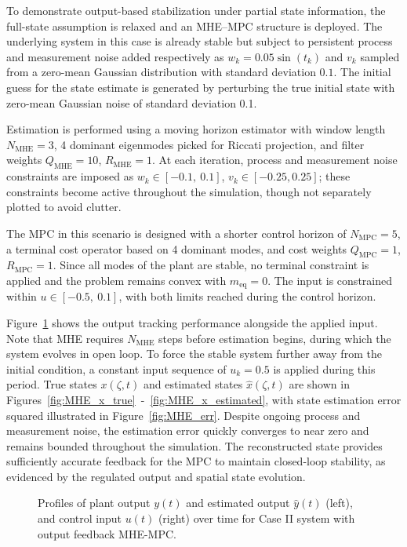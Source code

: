 To demonstrate output-based stabilization under partial state information, the full-state assumption is relaxed and an MHE--MPC structure is deployed. The underlying system in this case is already stable but subject to persistent process and measurement noise added respectively as $w_k = 0.05 \sin(t_k)$ and $v_k$ sampled from a zero-mean Gaussian distribution with standard deviation $0.1$. The initial guess for the state estimate is generated by perturbing the true initial state with zero-mean Gaussian noise of standard deviation 0.1. 

Estimation is performed using a moving horizon estimator with window length $N_{\mathrm{MHE}} = 3$, 4 dominant eigenmodes picked for Riccati projection, and filter weights $Q_{\mathrm{MHE}} = 10$, $R_{\mathrm{MHE}} = 1$. At each iteration, process and measurement noise constraints are imposed as $w_k \in [-0.1,\ 0.1]$, $v_k \in [-0.25, 0.25]$; these constraints become active throughout the simulation, though not separately plotted to avoid clutter.

The MPC in this scenario is designed with a shorter control horizon of $N_{\mathrm{MPC}} = 5$, a terminal cost operator based on 4 dominant modes, and cost weights $Q_{\mathrm{MPC}} = 1$, $R_{\mathrm{MPC}} = 1$. Since all modes of the plant are stable, no terminal constraint is applied and the problem remains convex with $m_{\mathrm{eq}} = 0$. The input is constrained within $u \in [-0.5,\ 0.1]$, with both limits reached during the control horizon.

Figure~\ref{fig:input_output_MHE} shows the output tracking performance alongside the applied input. Note that MHE requires $N_{\mathrm{MHE}}$ steps before estimation begins, during which the system evolves in open loop. To force the stable system further away from the initial condition, a constant input sequence of $u_k = 0.5$ is applied during this period. True states $x(\zeta,t)$ and estimated states $\hat{x}(\zeta,t)$ are shown in Figures~\ref{fig:MHE_x_true}~-~\ref{fig:MHE_x_estimated}, with state estimation error squared illustrated in Figure~\ref{fig:MHE_err}. Despite ongoing process and measurement noise, the estimation error quickly converges to near zero and remains bounded throughout the simulation. The reconstructed state provides sufficiently accurate feedback for the MPC to maintain closed-loop stability, as evidenced by the regulated output and spatial state evolution.

\begin{figure}[!htbp]
    \centering
    
    \caption{Profiles of plant output $y(t)$ and estimated output $\hat{y}(t)$ (left), and control input $u(t)$ (right) over time for Case II system with output feedback MHE-MPC.}
    \label{fig:input_output_MHE}
\end{figure}

